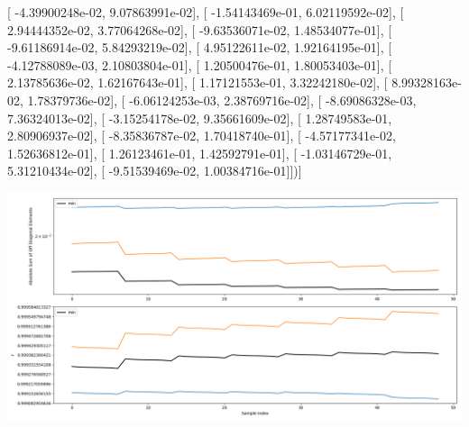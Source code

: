 \documentclass{article}
\begin{document}
       [ -4.39900248e-02,   9.07863991e-02],
       [ -1.54143469e-01,   6.02119592e-02],
       [  2.94444352e-02,   3.77064268e-02],
       [ -9.63536071e-02,   1.48534077e-01],
       [ -9.61186914e-02,   5.84293219e-02],
       [  4.95122611e-02,   1.92164195e-01],
       [ -4.12788089e-03,   2.10803804e-01],
       [  1.20500476e-01,   1.80053403e-01],
       [  2.13785636e-02,   1.62167643e-01],
       [  1.17121553e-01,   3.32242180e-02],
       [  8.99328163e-02,   1.78379736e-02],
       [ -6.06124253e-03,   2.38769716e-02],
       [ -8.69086328e-03,   7.36324013e-02],
       [ -3.15254178e-02,   9.35661609e-02],
       [  1.28749583e-01,   2.80906937e-02],
       [ -8.35836787e-02,   1.70418740e-01],
       [ -4.57177341e-02,   1.52636812e-01],
       [  1.26123461e-01,   1.42592791e-01],
       [ -1.03146729e-01,   5.31210434e-02],
       [ -9.51539469e-02,   1.00384716e-01]])]
\begin{center}
\includegraphics[scale=.9]{report_pickled_controls124/control_dpn_all.png}

\end{center}
\end{document}
